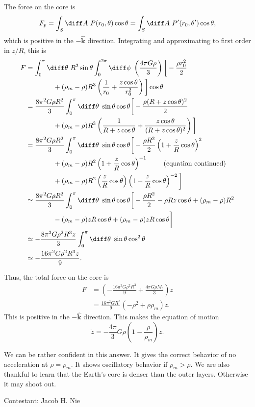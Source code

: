 \documentclass[12pt]{article}
\begin{document}
The force on the core is 
 \[
	 F_p = \int_S \diff A \ P(r_0,\theta) \cos\theta = \int_S \diff A \ P'(r_0,\theta') \cos\theta,
\]
which is positive in the $-\hat{\mathbf{k}}$ direction.  Integrating and approximating to first order in $z/R$, this is
\begingroup
\allowdisplaybreaks
\begin{align*}
	F &= \int_0^{\pi} \diff \theta \ R^2 \sin\theta \int_0^{2\pi} \diff \phi \ \left( \frac{4\pi G \rho}{3} \right) \bigg[ -\frac{\rho r_0^2}{2} \\
	  & \qquad \qquad + (\rho_m - \rho) R^3\left( \frac{1}{r_0} + \frac{z\cos \theta}{r_0^2} \right) \bigg] \cos \theta  \\
	  &= \frac{8\pi^2 G \rho R^2}{3} \int_0^{\pi} \diff \theta \ \sin\theta \cos\theta \bigg [ -\frac{\rho (R+z\cos\theta)^2}{2} \\
	  & \qquad \qquad + (\rho_m - \rho) R^3 \left( \frac{1}{R+z\cos\theta} + \frac{z\cos\theta}{(R+z\cos\theta)^2} \right) \bigg]\\
	  &= \frac{8\pi^2 G \rho R^2}{3} \int_0 ^{\pi} \diff \theta \ \sin\theta \cos\theta \bigg [ -\frac{\rho R^2}{2}\left( 1 + \frac{z}{R}\cos\theta \right)^2 \\
	  & \qquad \qquad + (\rho_m - \rho)R^2 \left( 1 + \frac{z}{R}\cos\theta \right)^{-1} \qquad \text{ (equation continued)}\\
	  &\qquad \qquad + (\rho_m - \rho)R^2 \left( \frac{z}{R}\cos\theta \right)\left( 1 + \frac{z}{R}\cos\theta \right)^{-2}\bigg] \\
	  &\simeq \frac{8\pi^2 G\rho R^2}{3} \int_0^{\pi} \diff\theta \ \sin\theta \cos\theta \bigg[- \frac{\rho R^2}{2} - \rho Rz\cos\theta + (\rho_m - \rho)R^2 \\
	  & \qquad \qquad - (\rho_m -\rho)zR\cos\theta + (\rho_m - \rho)zR\cos\theta \bigg] \\
	  &\simeq -\frac{8\pi^2 G \rho^2 R^3 z}{3} \int_0^{\pi} \diff \theta \ \sin\theta \cos^2\theta \\
	  &\simeq -\frac{16\pi^2 G\rho^2 R^3 z}{9}.
\end{align*}
\endgroup

Thus, the total force on the core is 
\begin{align*}
	F &= \left( -\frac{16\pi^2 G \rho^2 R^3}{9} + \frac{4\pi G \rho M_c}{3} \right)z \\
	  &= \frac{16\pi^2 G R^3}{9}(-\rho^2 + \rho \rho_m)z.
\end{align*}
This is positive in the $-\hat{\mathbf{k}}$ direction.  This makes the equation of motion 
\[
	\ddot{z} = -\frac{4\pi}{3}G\rho \left( 1-\frac{\rho}{\rho_m} \right)z.
\]

We can be rather confident in this answer.  It gives the correct behavior of no acceleration at $\rho = \rho_m$. It shows oscillatory behavior if $\rho_m > \rho$.  We are also thankful to learn that the Earth's core is denser than the outer layers.  Otherwise it may shoot out.

\vspace{1cm}

\hfill Contestant: Jacob H. Nie
\end{document}

